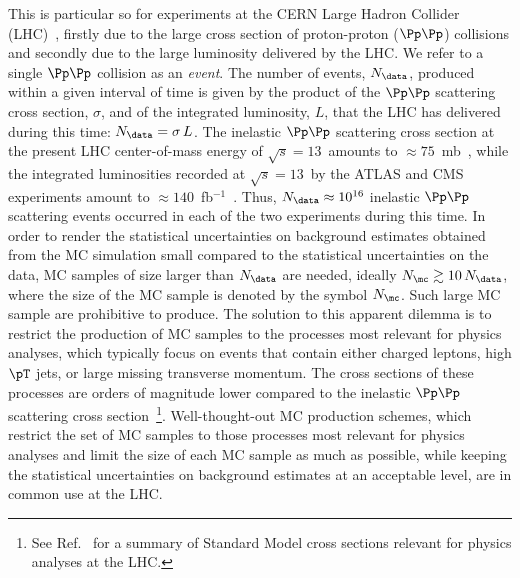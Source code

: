 This is particular so for experiments at the CERN Large Hadron Collider (LHC)~\cite{XXX},
firstly due to the large cross section of proton-proton ($\Pp\Pp$) collisions and secondly due to the large luminosity delivered by the LHC.
We refer to a single $\Pp\Pp$ collision as an {\em event}.
The number of events, $N_{\data}$, produced within a given interval of time 
is given by the product of the $\Pp\Pp$ scattering cross section, $\sigma$, and of the integrated luminosity, $L$, that the LHC has delivered during this time:
$N_{\data} = \sigma \, L$.
The inelastic $\Pp\Pp$ scattering cross section at the present LHC center-of-mass energy of $\sqrt{s}=13$~\TeV amounts to $\approx 75$~mb~\cite{Aaboud:2016mmw,Sirunyan:2018nqx},
while the integrated luminosities recorded at $\sqrt{s}=13$~\TeV by the ATLAS and CMS experiments amount to $\approx 140$~fb$^{-1}$~\cite{ATLAS-CONF-2019-021,LUM-17-001,LUM-17-004,LUM-18-002}.
Thus, $N_{\data} \approx 10^{16}$ inelastic $\Pp\Pp$ scattering events occurred in each of the two experiments during this time.
In order to render the statistical uncertainties on background estimates obtained from the MC simulation small compared to the statistical uncertainties on the data,
MC samples of size larger than $N_{\data}$ are needed, ideally $N_{\mc} \gtrsim 10 \, N_{\data}$,
where the size of the MC sample is denoted by the symbol $N_{\mc}$.
Such large MC sample are prohibitive to produce.
The solution to this apparent dilemma is to restrict the production of MC samples to the processes most relevant for physics analyses,
which typically focus on events that contain either charged leptons, high $\pT$ jets, or large missing transverse momentum.
The cross sections of these processes are orders of magnitude lower compared to the inelastic $\Pp\Pp$ scattering cross section~\footnote{ 
See Ref.~\cite{StandardModelCrossSections} for a summary of Standard Model cross sections relevant for physics analyses at the LHC.}.
Well-thought-out MC production schemes,
which restrict the set of MC samples to those processes most relevant for physics analyses
and limit the size of each MC sample as much as possible, 
while keeping the statistical uncertainties on background estimates at an acceptable level,
are in common use at the LHC.

